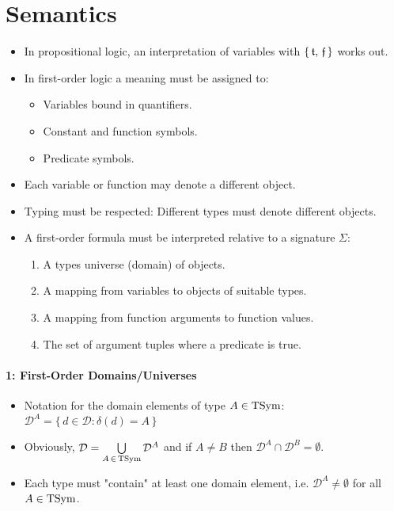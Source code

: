 \section{Semantics}
	\begin{itemize}
		\item In propositional logic, an interpretation of variables with \( \{\, \mathfrak{t},\, \mathfrak{f} \,\} \) works out.
		\item In first-order logic a meaning must be assigned to:
			\begin{itemize}
				\item Variables bound in quantifiers.
				\item Constant and function symbols.
				\item Predicate symbols.
			\end{itemize}
		\item Each variable or function may denote a different object.
		\item Typing must be respected: Different types must denote different objects.
		\item A first-order formula must be interpreted relative to a signature \(\Sigma\):
			\begin{enumerate}
				\item A types universe (domain) of objects.
				\item A mapping from variables to objects of suitable types.
				\item A mapping from function arguments to function values.
				\item The set of argument tuples where a predicate is true.
			\end{enumerate}
	\end{itemize}

	\paragraph{1: First-Order Domains/Universes}

		\begin{itemize}
			\item Notation for the domain elements of type \( A \in \operatorname{TSym} \): \( \mathcal{D}^A = \{\, d \in \mathcal{D} : \delta(d) = A \,\} \)
			\item Obviously, \( \mathcal{D} = \bigcup\limits_{ A \,\in\, \operatorname{TSym} } \mathcal{D}^A \) and if \( A \neq B \) then \( \mathcal{D}^A \cap \mathcal{D}^B = \emptyset \).
			\item Each type must "contain" at least one domain element, i.e. \( \mathcal{D}^A \neq \emptyset \) for all \( A \in \operatorname{TSym} \).
		\end{itemize}

